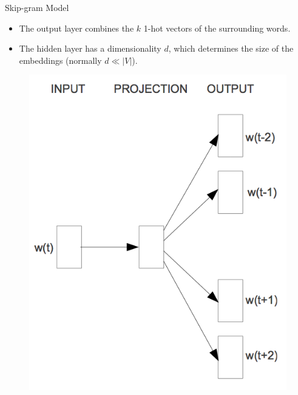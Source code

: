 \documentclass[handout]{beamer}
\begin{document}
\begin{frame}{Skip-gram Model}
\begin{scriptsize}
\begin{itemize}
\item The output layer combines the $k$ 1-hot vectors of the surrounding words. 
\item The hidden layer has a dimensionality $d$, which determines the size of the embeddings (normally $d \ll |V|$).
\end{itemize}
\end{scriptsize}
  \begin{figure}[h]
        	\includegraphics[scale = 0.4]{pics/skip-gram.png}
        \end{figure}

\end{frame}
\end{document}
